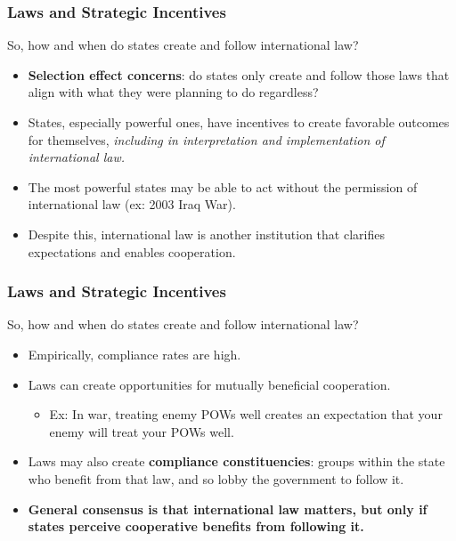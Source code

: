 \documentclass[handout]{beamer}
\begin{document}
\begin{frame} 
	\frametitle{\LARGE{Laws and Strategic Incentives}}
So, how and when do states create and follow international law? \pause
	\begin{itemize}
		\item \textbf{Selection effect concerns}: do states only create and follow those laws that align with what they were planning to do regardless? \pause
		\item States, especially powerful ones, have incentives to create favorable outcomes for themselves, \textit{including in interpretation and implementation of international law.} \pause
		\item The most powerful states may be able to act without the permission of international law (ex: 2003 Iraq War). \pause
		\item Despite this, international law is another institution that clarifies expectations and enables cooperation. 

	\end{itemize}
\end{frame}

\begin{frame} 
	\frametitle{\LARGE{Laws and Strategic Incentives}}
	So, how and when do states create and follow international law? 
	\begin{itemize}
		\item Empirically, compliance rates are high. \pause
		\item Laws can create opportunities for mutually beneficial cooperation. 
		\begin{itemize}
			\item Ex: In war, treating enemy POWs well creates an expectation that your enemy will treat your POWs well. \pause
		\end{itemize}
		\item Laws may also create \textbf{compliance constituencies}: groups within the state who benefit from that law, and so lobby the government to follow it. \pause
		\item \textbf{General consensus is that international law matters, but only if states perceive cooperative benefits from following it.}		
	\end{itemize}
\end{frame}
\end{document}
